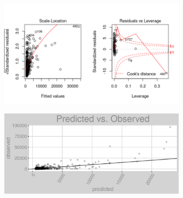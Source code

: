 \begin{figure}[h]
\centering
\begin{subfigure}{1\textwidth}
\centering
\includegraphics[width=.99\textwidth, height=0.475\textheight]{Images/fuel_oil_rfe_res_2.png}
\end{subfigure}
\begin{subfigure}{1\textwidth}
\centering
\includegraphics[width=.99\textwidth, height=0.3\textheight]{Images/fuel_oil_rfe_pvo.png}
\end{subfigure}
\end{figure}
\FloatBarrier
\newpage
